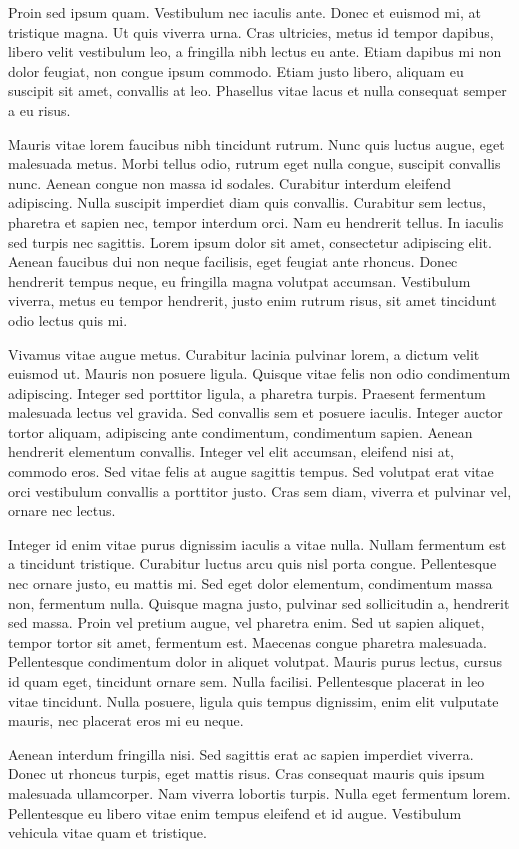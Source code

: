 \documentclass{scrartcl}
\begin{document}
Proin sed ipsum quam. Vestibulum nec iaculis ante. Donec et euismod mi, at tristique magna. Ut quis viverra urna. Cras ultricies, metus id tempor dapibus, libero velit vestibulum leo, a fringilla nibh lectus eu ante. Etiam dapibus mi non dolor feugiat, non congue ipsum commodo. Etiam justo libero, aliquam eu suscipit sit amet, convallis at leo. Phasellus vitae lacus et nulla consequat semper a eu risus.

Mauris vitae lorem faucibus nibh tincidunt rutrum. Nunc quis luctus augue, eget malesuada metus. Morbi tellus odio, rutrum eget nulla congue, suscipit convallis nunc. Aenean congue non massa id sodales. Curabitur interdum eleifend adipiscing. Nulla suscipit imperdiet diam quis convallis. Curabitur sem lectus, pharetra et sapien nec, tempor interdum orci. Nam eu hendrerit tellus. In iaculis sed turpis nec sagittis. Lorem ipsum dolor sit amet, consectetur adipiscing elit. Aenean faucibus dui non neque facilisis, eget feugiat ante rhoncus. Donec hendrerit tempus neque, eu fringilla magna volutpat accumsan. Vestibulum viverra, metus eu tempor hendrerit, justo enim rutrum risus, sit amet tincidunt odio lectus quis mi.

Vivamus vitae augue metus. Curabitur lacinia pulvinar lorem, a dictum velit euismod ut. Mauris non posuere ligula. Quisque vitae felis non odio condimentum adipiscing. Integer sed porttitor ligula, a pharetra turpis. Praesent fermentum malesuada lectus vel gravida. Sed convallis sem et posuere iaculis. Integer auctor tortor aliquam, adipiscing ante condimentum, condimentum sapien. Aenean hendrerit elementum convallis. Integer vel elit accumsan, eleifend nisi at, commodo eros. Sed vitae felis at augue sagittis tempus. Sed volutpat erat vitae orci vestibulum convallis a porttitor justo. Cras sem diam, viverra et pulvinar vel, ornare nec lectus.

Integer id enim vitae purus dignissim iaculis a vitae nulla. Nullam fermentum est a tincidunt tristique. Curabitur luctus arcu quis nisl porta congue. Pellentesque nec ornare justo, eu mattis mi. Sed eget dolor elementum, condimentum massa non, fermentum nulla. Quisque magna justo, pulvinar sed sollicitudin a, hendrerit sed massa. Proin vel pretium augue, vel pharetra enim. Sed ut sapien aliquet, tempor tortor sit amet, fermentum est. Maecenas congue pharetra malesuada. Pellentesque condimentum dolor in aliquet volutpat. Mauris purus lectus, cursus id quam eget, tincidunt ornare sem. Nulla facilisi. Pellentesque placerat in leo vitae tincidunt. Nulla posuere, ligula quis tempus dignissim, enim elit vulputate mauris, nec placerat eros mi eu neque.

Aenean interdum fringilla nisi. Sed sagittis erat ac sapien imperdiet viverra. Donec ut rhoncus turpis, eget mattis risus. Cras consequat mauris quis ipsum malesuada ullamcorper. Nam viverra lobortis turpis. Nulla eget fermentum lorem. Pellentesque eu libero vitae enim tempus eleifend et id augue. Vestibulum vehicula vitae quam et tristique.

\endnumbering
\end{document}
